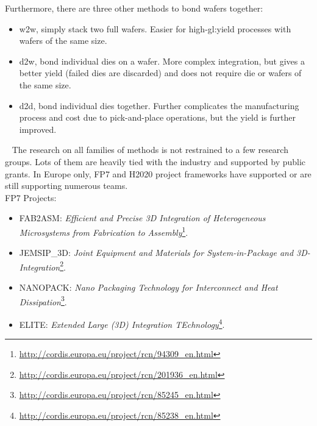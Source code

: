 \documentclass[11pt,a4paper]{report} %
\theoremstyle{customdef}
\begin{document}
Furthermore, there are three other methods to bond wafers together: 
\begin{itemize}
	\item \gls{w2w}, simply stack two full wafers. Easier for high-\gls{gl:yield} processes with wafers of the same size.
	\item \gls{d2w}, bond individual dies on a wafer. More complex integration, but gives a better yield (failed dies are discarded) and does not require die or wafers of the same size.
	\item \gls{d2d}, bond individual dies together. Further complicates the manufacturing process and cost due to pick-and-place operations, but the yield is further improved.
\end{itemize}


~\newline{}
The research on all families of methods is not restrained to a few research groups.
Lots of them are heavily tied with the industry and supported by public grants.
In Europe only, FP7 and H2020 project frameworks have supported or are still supporting numerous teams.\\

FP7 Projects:
\begin{itemize}
	\item FAB2ASM: \textit{Efficient and Precise 3D Integration of Heterogeneous Microsystems from Fabrication to Assembly}\footnote{\url{http://cordis.europa.eu/project/rcn/94309_en.html}}.

	\item JEMSIP\_3D: \textit{Joint Equipment and Materials for System-in-Package and 3D-Integration}\footnote{\url{http://cordis.europa.eu/project/rcn/201936_en.html}}.
	\item NANOPACK: \textit{Nano Packaging Technology for Interconnect and Heat Dissipation}\footnote{\url{http://cordis.europa.eu/project/rcn/85245_en.html}}.
	\item ELITE: \textit{Extended Large (3D) Integration TEchnology}\footnote{\url{http://cordis.europa.eu/project/rcn/85238_en.html}}.
\end{itemize}
\end{document}
